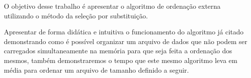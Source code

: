 O objetivo desse trabalho é apresentar o algoritmo de ordenação externa utilizando o método da seleção por substituição.\par
Apresentar de forma didática e intuitiva o funcionamento do algoritmo já citado demonstrando como é possível organizar um arquivo de dados que não podem ser carregados simultaneamente na memória para que seja feita a ordenação dos mesmos, também demonstraremos o tempo que este mesmo algoritmo leva em média para ordenar um arquivo de tamanho definido a seguir.\par
